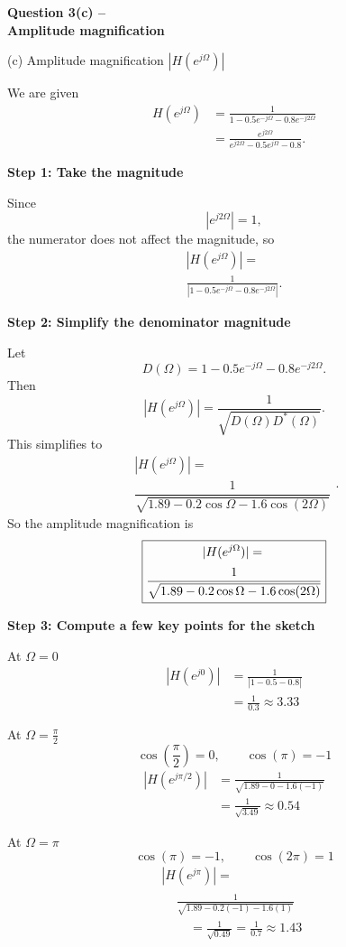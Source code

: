 \documentclass[11pt,border=5pt]{standalone}
\newcommand{\stepheading}[1]{\par\vspace{5pt}\textbf{#1}\par}
\newcommand{\magnitudeformula}{%
  \begin{gathered}
  |H(e^{j\Omega})|={}\\[2pt]
  \dfrac{1}{\sqrt{1.89-0.2\cos\Omega-1.6\cos(2\Omega)}}
  \end{gathered}}
\begin{document}
\begin{minipage}{260pt}
\begin{center}
{\large\bfseries Question 3(c) --\\[2pt]
Amplitude magnification}
\end{center}
\vspace{-3pt}

(c) Amplitude magnification \( |H(e^{j\Omega})| \)

We are given
\[
\begin{aligned}
H(e^{j\Omega})
&=\frac{1}{1-0.5e^{-j\Omega}-0.8e^{-j2\Omega}}\\[5pt]
&=\frac{e^{j2\Omega}}{e^{j2\Omega}-0.5e^{j\Omega}-0.8}.
\end{aligned}
\]

\stepheading{Step 1: Take the magnitude}
Since
\[
|e^{j2\Omega}|=1,
\]
the numerator does not affect the magnitude, so
\[
\begin{gathered}
|H(e^{j\Omega})|={}\\[2pt]
\frac{1}{\left|1-0.5e^{-j\Omega}-0.8e^{-j2\Omega}\right|}.
\end{gathered}
\]

\stepheading{Step 2: Simplify the denominator magnitude}
Let
\[
D(\Omega)=1-0.5e^{-j\Omega}-0.8e^{-j2\Omega}.
\]
Then
\[
|H(e^{j\Omega})|
=\frac{1}{\sqrt{D(\Omega)D^*(\Omega)}}.
\]
This simplifies to
\[
\magnitudeformula.
\]
So the amplitude magnification is
\[
\boxed{\magnitudeformula}
\]

\stepheading{Step 3: Compute a few key points for the sketch}
At \(\Omega=0\)
\[
\begin{aligned}
|H(e^{j0})|
&=\frac{1}{|1-0.5-0.8|}\\[4pt]
&=\frac{1}{0.3}\approx 3.33
\end{aligned}
\]

At \(\Omega=\frac{\pi}{2}\)
\[
\cos\left(\frac{\pi}{2}\right)=0,
\qquad\cos(\pi)=-1
\]
\[
\begin{aligned}
|H(e^{j\pi/2})|
&=\frac{1}{\sqrt{1.89-0-1.6(-1)}}\\[4pt]
&=\frac{1}{\sqrt{3.49}}\approx 0.54
\end{aligned}
\]

At \(\Omega=\pi\)
\[
\cos(\pi)=-1,\qquad\cos(2\pi)=1
\]
\[
\begin{gathered}
|H(e^{j\pi})|={}\\[2pt]
\begin{aligned}
&\frac{1}{\sqrt{1.89-0.2(-1)-1.6(1)}}\\[4pt]
&\quad=\frac{1}{\sqrt{0.49}}
=\frac{1}{0.7}\approx 1.43
\end{aligned}
\end{gathered}
\]


\end{minipage}
\end{document}
